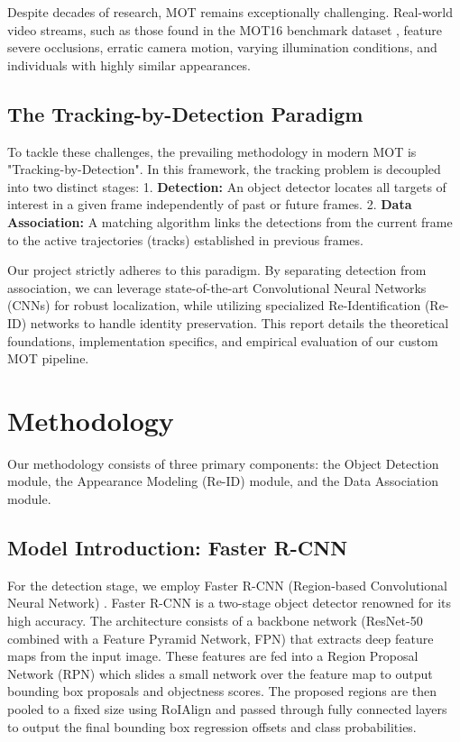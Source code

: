 \documentclass[11pt, letterpaper]{article}
\begin{document}
Despite decades of research, MOT remains exceptionally challenging. Real-world video streams, such as those found in the MOT16 benchmark dataset \cite{milan2016mot16}, feature severe occlusions, erratic camera motion, varying illumination conditions, and individuals with highly similar appearances. 

\subsection{The Tracking-by-Detection Paradigm}
To tackle these challenges, the prevailing methodology in modern MOT is "Tracking-by-Detection". In this framework, the tracking problem is decoupled into two distinct stages:
1. \textbf{Detection:} An object detector locates all targets of interest in a given frame independently of past or future frames.
2. \textbf{Data Association:} A matching algorithm links the detections from the current frame to the active trajectories (tracks) established in previous frames.

Our project strictly adheres to this paradigm. By separating detection from association, we can leverage state-of-the-art Convolutional Neural Networks (CNNs) for robust localization, while utilizing specialized Re-Identification (Re-ID) networks to handle identity preservation. This report details the theoretical foundations, implementation specifics, and empirical evaluation of our custom MOT pipeline.

\section{Methodology}

Our methodology consists of three primary components: the Object Detection module, the Appearance Modeling (Re-ID) module, and the Data Association module.

\subsection{Model Introduction: Faster R-CNN}
For the detection stage, we employ Faster R-CNN (Region-based Convolutional Neural Network) \cite{ren2015faster}. Faster R-CNN is a two-stage object detector renowned for its high accuracy. 
The architecture consists of a backbone network (ResNet-50 combined with a Feature Pyramid Network, FPN) that extracts deep feature maps from the input image. These features are fed into a Region Proposal Network (RPN) which slides a small network over the feature map to output bounding box proposals and objectness scores. The proposed regions are then pooled to a fixed size using RoIAlign and passed through fully connected layers to output the final bounding box regression offsets and class probabilities. 
\end{document}
